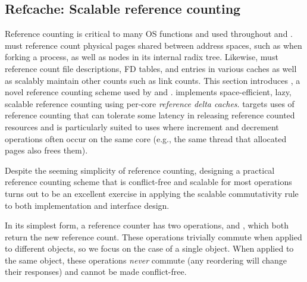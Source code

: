 \subsection{Refcache: Scalable reference counting}

Reference counting is critical to many OS functions and used
throughout \vm and \fs.  \vm must reference count physical pages
shared between address spaces, such as when forking a process, as well
as nodes in its internal radix tree.  Likewise, \fs must reference
count file descriptions, FD tables, and entries in various caches as
well as scalably maintain other counts such as link counts.
%
This section introduces , a novel reference counting scheme
used by \vm and \fs.   implements space-efficient, lazy,
scalable reference counting using per-core \emph{reference delta
  caches}.   targets uses of reference counting that can
tolerate some latency in releasing reference counted resources and is
particularly suited to uses where increment and decrement operations
often occur on the same core (e.g., the same thread that allocated
pages also frees them).


Despite the seeming simplicity of reference counting, designing a
practical reference counting scheme that is conflict-free and scalable
for most operations turns out to be an excellent exercise in applying
the scalable commutativity rule to both implementation and interface
design.

In its simplest form, a reference counter has two operations,
 and , which both return the new
reference count.  These operations trivially commute when applied to
different objects, so we focus on the case of a single object.  When
applied to the same object, these operations \emph{never} commute (any
reordering will change their responses) and cannot be made
conflict-free.

